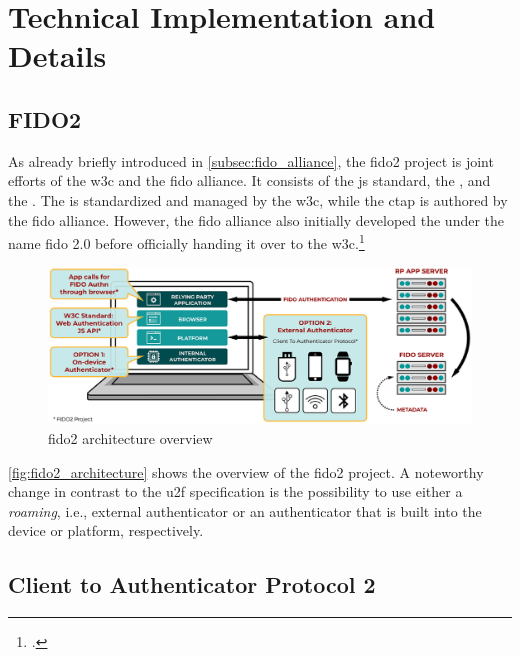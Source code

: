 \section{Technical Implementation and Details}

\subsection{FIDO2}

As already briefly introduced in \autoref{subsec:fido_alliance}, the \gls{fido}2 project is joint efforts of the \gls{w3c} and the \gls{fido} alliance. It consists of the \gls{js} standard, the \wa{}, and the . The \wa{} is standardized and managed by the \gls{w3c}, while the \gls{ctap} is authored by the \gls{fido} alliance. However, the \gls{fido} alliance also initially developed the \wa{} under the name \gls{fido} 2.0 before officially handing it over to the \gls{w3c}.\footcites[See][254]{Schwartz2018}[See][3]{FormalVerificationWebAuthn}

\begin{figure}[hbt]
	\centering
	\includegraphics[width=\textwidth]{pics/FIDO2-Graphic-v2.eps}
	\caption[\gls{fido}2 architecture overview]{\gls{fido}2 architecture overview\footnotemark}
	\label{fig:fido2_architecture}
\end{figure}

\autoref{fig:fido2_architecture} shows the overview of the \gls{fido}2 project. A noteworthy change in contrast to the \gls{u2f} specification is the possibility to use either a \textit{roaming}, i.e., external authenticator or an authenticator that is built into the device or platform, respectively.

\subsection{Client to Authenticator Protocol 2}

